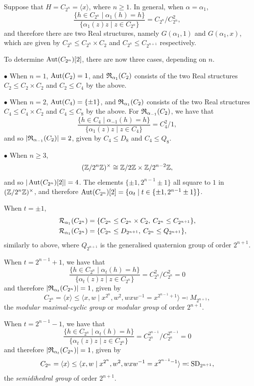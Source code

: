 \begin{eg}\label{eg:RealStructuresEvenPrimePower}
  Suppose that $H = C_{2^n} = \langle x \rangle$, where $n \geq 1$. In general, when $\alpha = \alpha_1$,
  \[
  \frac{\{h \in C_{2^n} \mid \alpha_1(h) = h\}}{\{\alpha_1(z)z \mid z \in C_{2^n}\}} = C_{2^n} / C_{2^n}^2,
  \]
  and therefore there are two Real structures, namely $G(\alpha_1, 1)$ and $G(\alpha_1, x)$, which are given by $C_{2^n} \leq C_{2^n} \times C_2$ and $C_{2^n} \leq C_{2^{n+1}}$ respectively.
  
  To determine $\operatorname{Aut}(C_{2^n})[2]$, there are now three cases, depending on $n$.
  
  $\bullet$ When $n = 1$, $\operatorname{Aut}(C_2) = 1$, and ${\mathfrak R}_{\alpha_1}(C_2)$ consists of the two Real structures $C_{2} \leq C_{2}\times C_2$ and $C_2 \leq C_4$ by the above.

  $\bullet$ When $n = 2$, $\operatorname{Aut}(C_4) = \{\pm 1\}$, and ${\mathfrak R}_{\alpha_1}(C_2)$ consists of the two Real structures $C_{4} \leq C_{4}\times C_2$ and $C_4 \leq C_8$ by the above. For ${\mathfrak R}_{\alpha_{-1}}(C_2)$, we have that
  \[
  \frac{\{h \in C_4 \mid \alpha_{-1}(h) = h\}}{\{\alpha_1(z)z \mid z \in C_4\}} = C_4^2 / 1,
  \]
  and so $|{\mathfrak R}_{\alpha_{-1}}(C_2)| = 2$, given by $C_4 \leq D_8$ and $C_4 \leq Q_8$.

  $\bullet$ When $n \geq 3$,
  \[
  ({\mathbb Z} / 2^n {\mathbb Z})^{\times} \cong {\mathbb Z} / 2 {\mathbb Z} \times {\mathbb Z} / 2^{n-2} {\mathbb Z},
  \]
  and so $|\operatorname{Aut}(C_{2^n})[2]| = 4$. The elements $\{\pm 1, 2^{n-1} \pm 1\}$ all square to $1$ in $({\mathbb Z} / 2^n {\mathbb Z})^{\times}$, and therefore $\operatorname{Aut}(C_{2^n})[2] = \{\alpha_t \mid t \in \{\pm 1, 2^{n-1} \pm 1\}\}$. 

  When $t = \pm 1$, 
  \begin{align*}
    {\mathcal R}_{\alpha_1}(C_{2^n}) &= \{C_{2^n} \leq C_{2^n} \times C_2, \: C_{2^n} \leq C_{2^{n+1}}\}, \\
    {\mathcal R}_{\alpha_1}(C_{2^n}) &= \{C_{2^n} \leq D_{2^{n+1}}, \: C_{2^n} \leq Q_{2^{n+1}}\},
  \end{align*}
  similarly to above, where $Q_{2^{n+1}}$ is the generalised quaternion group of order $2^{n+1}$. 
  
  When $t = 2^{n-1} + 1$, we have that 
  \[
  \frac{\{h \in C_{2^n} \mid \alpha_t(h) = h\}}{\{\alpha_t(z)z \mid z \in C_{2^n}\}} = C_{2^n}^2 / C_{2^n}^2 = 0
  \]
  and therefore $|{\mathfrak R}_{\alpha_t}(C_{2^n})| = 1$, given by 
\[
C_{2^n} = \langle x \rangle \leq \langle x , w \mid x^{2^n}, w^2, wxw^{-1} = x^{2^{n-1} + 1} \rangle \eqqcolon M_{2^{n+1}},
\]
the \emph{modular maximal-cyclic group} or \emph{modular group} of order $2^{n+1}$.

When $t = 2^{n-1} - 1$, we have that
\[
\frac{\{h \in C_{2^n} \mid \alpha_t(h) = h\}}{\{\alpha_t(z)z \mid z \in C_{2^n}\}} = C_{2^n}^{2^{n-1}} / C_{2^n}^{2^{n-1}} = 0
\]
and therefore $|{\mathfrak R}_{\alpha_t}(C_{2^n})| = 1$, given by 
\[
C_{2^n} = \langle x \rangle \leq \langle x , w \mid x^{2^n}, w^2, wxw^{-1} = x^{2^{n-1} - 1} \rangle \eqqcolon \operatorname{SD}_{2^{n+1}},
\]
the \emph{semidihedral group} of order $2^{n+1}$.
\end{eg}

